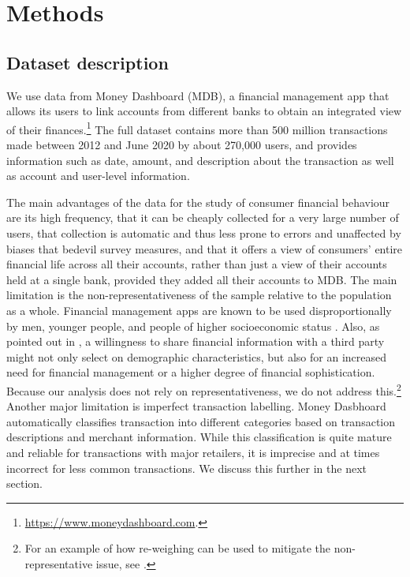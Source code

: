 
\section{Methods}%
\label{sec:methods}


\subsection{Dataset description}
\label{par:dataset_description}

We use data from Money Dashboard (MDB), a financial management app that allows
its users to link accounts from different banks to obtain an integrated view of
their
finances.\footnote{\href{https://www.moneydashboard.com}{https://www.moneydashboard.com}.}
The full dataset contains more than 500 million transactions made between 2012
and June 2020 by about 270,000 users, and provides information such as date,
amount, and description about the transaction as well as account and user-level
information.

The main advantages of the data for the study of consumer financial behaviour
are its high frequency, that it can be cheaply collected for a very large
number of users, that collection is automatic and thus less prone to errors and
unaffected by biases that bedevil survey measures, and that it offers a view of
consumers' entire financial life across all their accounts, rather than just a
view of their accounts held at a single bank, provided they added all their
accounts to MDB. The main limitation is the non-representativeness of the
sample relative to the population as a whole. Financial management apps are
known to be used disproportionally by men, younger people, and people of higher
socioeconomic status \citep{carlin2019generational}. Also, as pointed out in
\citet{gelman2014harnessing}, a willingness to share financial information with
a third party might not only select on demographic characteristics, but also
for an increased need for financial management or a higher degree of financial
sophistication. Because our analysis does not rely on representativeness, we do
not address this.\footnote{For an example of how re-weighing can be used to
mitigate the non-representative issue, see \citet{bourquin2020effects}.}
Another major limitation is imperfect transaction labelling. Money Dasbhoard
automatically classifies transaction into different categories based on
transaction descriptions and merchant information. While this classification is
quite mature and reliable for transactions with major retailers, it is
imprecise and at times incorrect for less common transactions. We discuss this
further in the next section.


